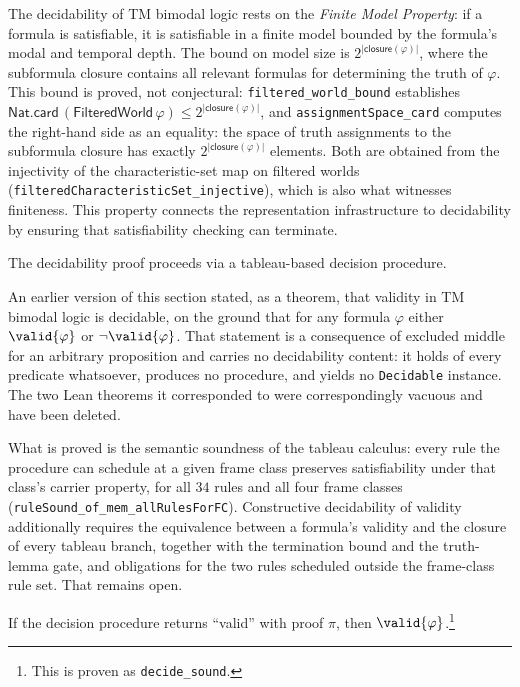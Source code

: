 \documentclass[../BimodalReference.tex]{subfiles}
\begin{document}
The decidability of TM bimodal logic rests on the \emph{Finite Model Property}: if a formula is satisfiable, it is satisfiable in a finite model bounded by the formula's modal and temporal depth.
The bound on model size is $2^{|\mathsf{closure}(\varphi)|}$, where the subformula closure contains all relevant formulas for determining the truth of $\varphi$.
This bound is proved, not conjectural: \texttt{filtered\_world\_bound} establishes $\mathsf{Nat.card}\,(\mathsf{FilteredWorld}\,\varphi) \leq 2^{|\mathsf{closure}(\varphi)|}$, and \texttt{assignmentSpace\_card} computes the right-hand side as an equality: the space of truth assignments to the subformula closure has exactly $2^{|\mathsf{closure}(\varphi)|}$ elements.
Both are obtained from the injectivity of the characteristic-set map on filtered worlds (\texttt{filteredCharacteristicSet\_injective}), which is also what witnesses finiteness.
This property connects the representation infrastructure to decidability by ensuring that satisfiability checking can terminate.

The decidability proof proceeds via a tableau-based decision procedure.

\begin{remark}
An earlier version of this section stated, as a theorem, that validity in TM bimodal logic is decidable, on the ground that for any formula $\varphi$ either $\valid{\varphi}$ or $\neg\valid{\varphi}$.
That statement is a consequence of excluded middle for an arbitrary proposition and carries no decidability content: it holds of every predicate whatsoever, produces no procedure, and yields no \texttt{Decidable} instance.
The two Lean theorems it corresponded to were correspondingly vacuous and have been deleted.

What is proved is the semantic soundness of the tableau calculus: every rule the procedure can schedule at a given frame class preserves satisfiability under that class's carrier property, for all $34$ rules and all four frame classes (\texttt{ruleSound\_of\_mem\_allRulesForFC}).
Constructive decidability of validity additionally requires the equivalence between a formula's validity and the closure of every tableau branch, together with the termination bound and the truth-lemma gate, and obligations for the two rules scheduled outside the frame-class rule set.
That remains open.
\end{remark}

\begin{theorem}
If the decision procedure returns ``valid'' with proof $\pi$, then $\valid{\varphi}$.\footnote{This is proven as \texttt{decide\_sound}.}
\end{theorem}
\end{document}
